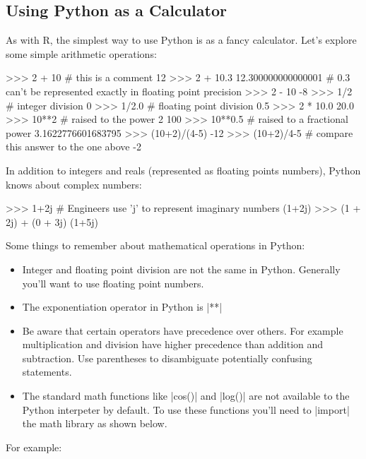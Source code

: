 \subsection{Using Python as a Calculator}

As with R, the simplest way to use Python is as a fancy calculator.
Let's explore some simple arithmetic operations:
%
\begin{python}
>>> 2 + 10   # this is a comment
12
>>> 2 + 10.3
 12.300000000000001  # 0.3 can't be represented exactly in floating point precision
>>> 2 - 10
-8
>>> 1/2  # integer division
0
>>> 1/2.0  # floating point division
0.5
>>> 2 * 10.0
20.0
>>> 10**2  # raised to the power 2
100
>>> 10**0.5  # raised to a fractional power
3.1622776601683795
>>> (10+2)/(4-5)
-12
>>> (10+2)/4-5  # compare this answer to the one above 
-2
\end{python}
%
In addition to integers and reals (represented as floating points
numbers), Python knows about complex numbers:
%
\begin{python}
>>> 1+2j  # Engineers use 'j' to represent imaginary numbers
(1+2j)
>>> (1 + 2j) + (0 + 3j)
(1+5j)
\end{python}

Some things to remember about mathematical operations in Python:
\begin{itemize}
\item
  Integer and floating point division are not the same in Python.
  Generally you'll want to use floating point numbers.
\item
  The exponentiation operator in Python is |**|
\item
  Be aware that certain operators have precedence over others. For
  example multiplication and division have higher precedence than
  addition and subtraction. Use parentheses to disambiguate potentially
  confusing statements.
\item
  The standard math functions like |cos()| and
  |log()| are not available to the Python interpeter by
  default. To use these functions you'll need to |import| the
  math library as shown below.
\end{itemize}

For example:
%

